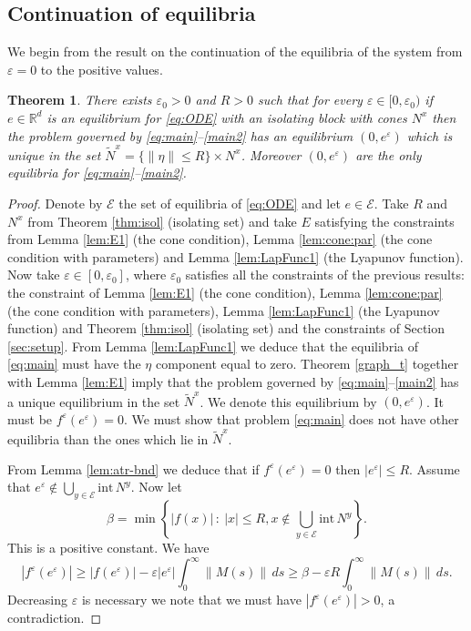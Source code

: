 \documentclass[11pt, leqno]{amsart}
\newtheorem{thm}{Theorem}[section]
\theoremstyle{definition}
\def\R{\mathbb{R}}
\begin{document}
\subsection{Continuation of equilibria} We begin from the result on the continuation of the equilibria of the system from $\varepsilon=0$ to the positive values.
\begin{thm}\label{thm:equilibria}
	There exists $\varepsilon_0>0$ and $R>0$ such that for every $\varepsilon\in [0,\varepsilon_0)$ if $e\in \R^d$ is an equilibrium for \eqref{eq:ODE} with an isolating block with cones $N^x$ then the problem governed by \eqref{eq:main}--\eqref{main2} has an equilibrium $(0,e^\varepsilon)$ which is unique in the set $\widetilde{N}^x =  \{ \|\eta\|\leq R \} \times N^x$.  Moreover $(0,e^\varepsilon)$ are the only equilibria for \eqref{eq:main}--\eqref{main2}.
	\end{thm}
\begin{proof}
	Denote by $\mathcal{E}$ the set of equilibria of \eqref{eq:ODE} and let $e\in \mathcal{E}$. Take $R$ and $N^x$ from Theorem \ref{thm:isol} (isolating set) and take $E$ satisfying the constraints from Lemma \ref{lem:E1} (the cone condition), Lemma \ref{lem:cone:par} (the cone condition with parameters) and Lemma \ref{lem:LapFunc1} (the Lyapunov function). Now take $\varepsilon \in [0,\varepsilon_0]$, where $\varepsilon_0$ satisfies all the constraints of the previous results: the constraint of  Lemma \ref{lem:E1} (the cone condition), Lemma \ref{lem:cone:par} (the cone condition with parameters), Lemma \ref{lem:LapFunc1} (the Lyapunov function) and Theorem \ref{thm:isol} (isolating set) and the constraints of Section \ref{sec:setup}. From Lemma \ref{lem:LapFunc1} we deduce that the equilibria of \eqref{eq:main} must have the $\eta$ component equal to zero. Theorem \ref{graph_t} together with Lemma \ref{lem:E1} imply that the  problem governed by \eqref{eq:main}--\eqref{main2} has a unique equilibrium in the set $\widetilde{N}^x$. We denote this equilibrium by $(0,e^\varepsilon)$. It must be $f^\varepsilon(e^\varepsilon) = 0$. We must show that problem \eqref{eq:main} does not have other equilibria than the ones which lie in $\widetilde{N}^x$.
	
	From Lemma \ref{lem:atr-bnd}  we deduce that if $f^\varepsilon(e^\varepsilon) = 0$ then $|e^\varepsilon| \leq R$. Assume that $e^\varepsilon \notin \bigcup_{y\in \mathcal{E}}\textrm{int}\, N^y$. Now let
	$$\beta = \min\left\{|f(x)|\,:\ |x|\leq {R}, x\notin \bigcup_{y\in \mathcal{E}}\textrm{int}\, N^y\right\}.
	$$
	This is a positive constant. We have
	$$
	|f^\varepsilon(e^\varepsilon)| \geq |f(e^\varepsilon)| - \varepsilon|e^\varepsilon| \int_0^\infty \|M(s)\|\, ds \geq  \beta - \varepsilon  R \int_0^\infty \|M(s)\|\, ds.
	$$
	Decreasing $\varepsilon$ is necessary we note that we must have $|f^\varepsilon(e^\varepsilon)| > 0$, a contradiction.
\end{proof}
\end{document}
